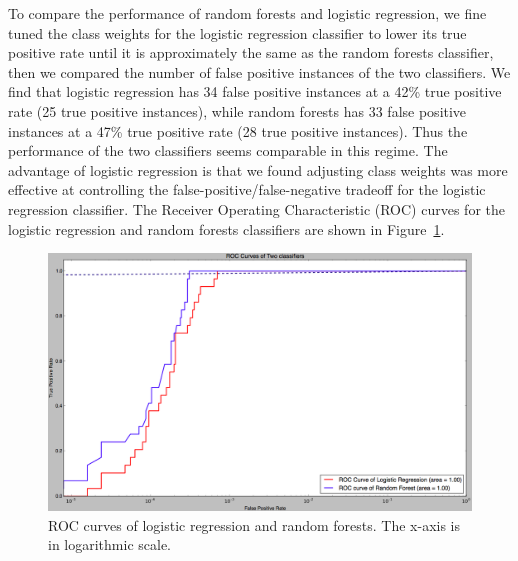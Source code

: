To compare the performance of random forests and logistic regression, we fine tuned the class weights for the logistic regression classifier to lower its true positive rate until it is approximately the same as the random forests classifier, then we compared the number of false positive instances of the two classifiers.
We find that logistic regression has 34 false positive instances at a 42\% true positive rate (25 true positive instances),
while random forests has 33 false positive instances at a 47\% true positive rate (28 true positive instances).
Thus the performance of the two classifiers seems comparable in this regime.
The advantage of logistic regression is that we found adjusting class weights was more effective at controlling the false-positive/false-negative tradeoff for the logistic regression classifier.
The Receiver Operating Characteristic (ROC) curves for the logistic regression and random forests classifiers are shown in Figure~\ref{fig:roc}.

\begin{figure}[t]
\begin{center}
\includegraphics[width=1.0\columnwidth]{roc_curves_log_line.png}
\end{center}
\caption{ROC curves of logistic regression and random forests. The x-axis is in logarithmic scale.}
\label{fig:roc}
\end{figure}


